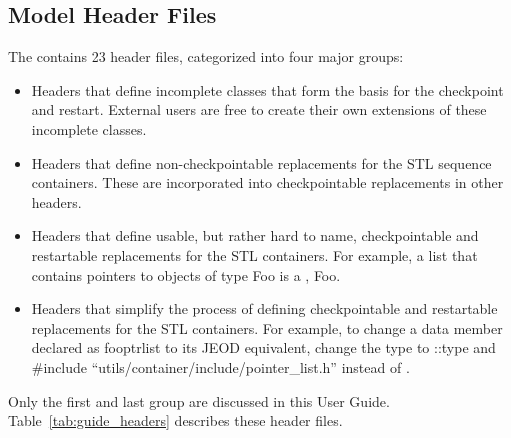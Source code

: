 \subsection{Model Header Files}
The \ModelDesc contains 23 header files,
categorized into four major groups:
\begin{itemize}
\item Headers that define incomplete classes that form the
  basis for the checkpoint and restart. External users are
  free to create their own extensions of these incomplete classes.
\item Headers that define non-checkpointable replacements for
  the STL sequence containers. These are incorporated into
  checkpointable replacements in other headers.
\item Headers that define usable, but rather hard to name,
  checkpointable and restartable replacements for the STL containers.
  For example, a list that contains pointers to objects of type Foo
  is a 
  {, Foo}.
\item Headers that simplify the process of defining
  checkpointable and restartable replacements for the STL containers.
  For example, to change a data member declared as
   foo\funder{}ptr\funder{}list
  to its JEOD equivalent,
  change the type to  ::type and
  \#include ``utils/container/include/pointer\_list.h'' instead of
  .
\end{itemize}
Only the first and last group are discussed in this User Guide.
Table~\ref{tab:guide_headers} describes these header files.


